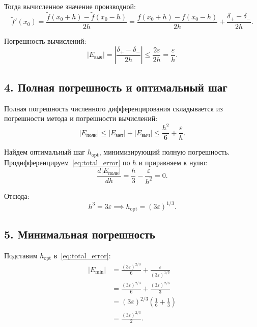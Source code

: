 \documentclass{article}
\begin{document}
Тогда вычисленное значение производной:
\begin{equation}
\tilde{f}'(x_0) = \frac{\tilde{f}(x_0 + h) - \tilde{f}(x_0 - h)}{2h} = \frac{f(x_0 + h) - f(x_0 - h)}{2h} + \frac{\delta_+ - \delta_-}{2h}.
\end{equation}

Погрешность вычислений:
\begin{equation}
|E_{\text{выч}}| = \left|\frac{\delta_+ - \delta_-}{2h}\right| \leq \frac{2\varepsilon}{2h} = \frac{\varepsilon}{h}.
\label{eq:comp_error}
\end{equation}

\subsection*{4. Полная погрешность и оптимальный шаг}

Полная погрешность численного дифференцирования складывается из погрешности метода и погрешности вычислений:
\begin{equation}
|E_{\text{полн}}| \leq |E_{\text{мет}}| + |E_{\text{выч}}| \leq \frac{h^2}{6} + \frac{\varepsilon}{h}.
\label{eq:total_error}
\end{equation}

Найдем оптимальный шаг $h_{\text{opt}}$, минимизирующий полную погрешность. Продифференцируем~\eqref{eq:total_error} по $h$ и приравняем к нулю:
\begin{equation}
\frac{d|E_{\text{полн}}|}{dh} = \frac{h}{3} - \frac{\varepsilon}{h^2} = 0.
\end{equation}

Отсюда:
\begin{equation}
h^3 = 3\varepsilon \implies \boxed{h_{\text{opt}} = (3\varepsilon)^{1/3}.}
\label{eq:h_opt}
\end{equation}

\subsection*{5. Минимальная погрешность}

Подставим $h_{\text{opt}}$ в~\eqref{eq:total_error}:
\begin{align}
|E_{\text{min}}| &= \frac{(3\varepsilon)^{2/3}}{6} + \frac{\varepsilon}{(3\varepsilon)^{1/3}} \nonumber \\
&= \frac{(3\varepsilon)^{2/3}}{6} + \frac{(3\varepsilon)^{2/3}}{3} \nonumber \\
&= (3\varepsilon)^{2/3} \left(\frac{1}{6} + \frac{1}{3}\right) \nonumber \\
&= \frac{(3\varepsilon)^{2/3}}{2}.
\end{align}
\end{document}
